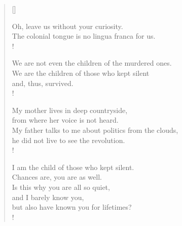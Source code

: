 
\settowidth{\versewidth}{Oh, throw me into the dark deep water\=it knows us so well.}

\prelude

\begin{verse}[\versewidth]
  
Oh, leave us without your curiosity.\\
The colonial tongue is no lingua franca for us.\\!

We are not even the children of the murdered ones.\\
We are the children of those who kept silent\\
and, thus, survived.\\!

My mother lives in deep countryside,\\
from where her voice is not heard.\\
My father talks to me about politics from the clouds,\\
he did not live to see the revolution.\\!

I am the child of those who kept silent.\\
Chances are, you are as well.\\
Is this why you are all so quiet,\\
and I barely know you,\\
but also have known you for lifetimes?\\!

\end{verse}

\fugue

